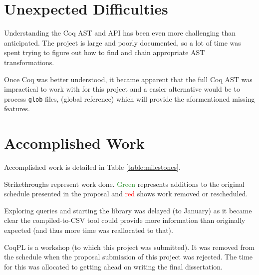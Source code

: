 \documentclass[12pt,a4paper]{article}
\begin{document}
\section*{Unexpected Difficulties}

Understanding the Coq AST and API has been even more challenging than
anticipated.  The project is large and poorly documented, so a lot of time was
spent trying to figure out how to find and chain appropriate AST
transformations.

Once Coq was better understood, it became apparent that the full Coq AST was
impractical to work with for this project and a easier alternative would be to
process \texttt{glob} files, (global reference) which will provide the
aformentioned missing features.

\section*{Accomplished Work}

Accomplished work is detailed in Table \ref{table:milestones}.

\sout{Strikethroughs} represent work done. \textcolor{ForestGreen}{Green}
represents additions to the original schedule presented in the proposal and
\textcolor{red}{red} shows work removed or rescheduled.

Exploring queries and starting the library was delayed (to January) as it
became clear the compiled-to-CSV tool could provide more information than
originally expected (and thus more time was reallocated to that).

CoqPL is a workshop (to which this project was submitted). It was removed from
the schedule when the proposal submission of this project was rejected.  The
time for this was allocated to getting ahead on writing the final dissertation.
\end{document}
